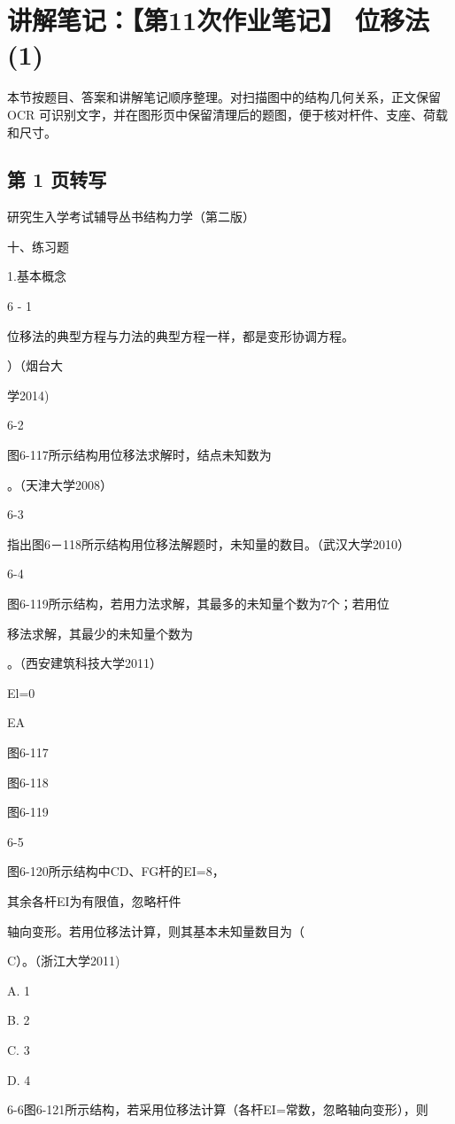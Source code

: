 \section{讲解笔记：【第11次作业笔记】 位移法(1)}
\begin{analysisbox}
本节按题目、答案和讲解笔记顺序整理。对扫描图中的结构几何关系，正文保留 OCR 可识别文字，并在图形页中保留清理后的题图，便于核对杆件、支座、荷载和尺寸。
\end{analysisbox}
\subsection*{第 1 页转写}
研究生入学考试辅导丛书结构力学（第二版）

十、练习题

1.基本概念

6 - 1

位移法的典型方程与力法的典型方程一样，都是变形协调方程。

）（烟台大

学2014)

6-2

图6-117所示结构用位移法求解时，结点未知数为

。（天津大学2008）

6-3

指出图6－118所示结构用位移法解题时，未知量的数目。（武汉大学2010）

6-4

图6-119所示结构，若用力法求解，其最多的未知量个数为7个；若用位

移法求解，其最少的未知量个数为

。（西安建筑科技大学2011）

El=0

EA

图6-117

图6-118

图6-119

6-5

图6-120所示结构中CD、FG杆的EI=8，

其余各杆EI为有限值，忽略杆件

轴向变形。若用位移法计算，则其基本未知量数目为（

C）。（浙江大学2011)

A. 1

B. 2

C. 3

D. 4

6-6图6-121所示结构，若采用位移法计算（各杆EI=常数，忽略轴向变形），则

